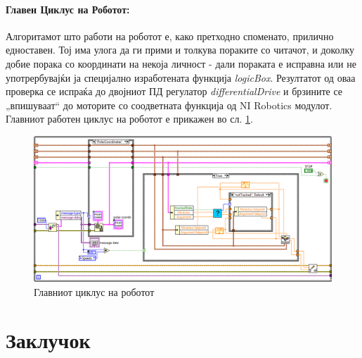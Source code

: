 \documentclass[11pt]{article}
\begin{document}
    \paragraph{Главен Циклус на Роботот:\\}
      Алгоритамот што работи на роботот е, како претходно споменато, прилично едноставен. Тој има улога да ги прими и толкува пораките со читачот, и доколку добие порака со координати на некоја личност - дали пораката е исправна или не употрербувајќи ја специјално изработената функција \textit{logicBox}. Резултатот од оваа проверка се испраќа до двојниот ПД регулатор \textit{differentialDrive} и брзините се „впишуваат“ до моторите со соодветната функција од NI Robotics модулот. Главниот работен циклус на роботот е прикажен во сл. \ref{fig:robot_main}.
      \begin{figure}[H]
        \centering
        \includegraphics[angle = -90, scale = 0.8]{./images/robot_main_loop.png}
        \caption{Главниот циклус на роботот}
        \label{fig:robot_main}
      \end{figure}

\newpage

\section{Заклучок}
\end{document}
